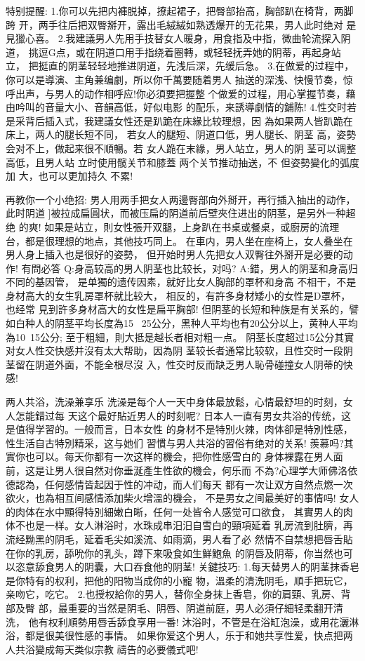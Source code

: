 \documentclass[12pt,UTF8]{ctexbook}
\begin{document}
特别提醒:
1.你可以先把内褲脱掉，撩起裙子，把臀部抬高，胸部趴在椅背，两脚跨
开，两手往后把双臀掰开，露出毛絨絨如熟透爆开的无花果，男人此时绝对
是見獵心喜。
2.我建議男人先用手技替女人暖身，用食指及中指，微曲轮流探入阴道，
挑逗G点，或在阴道口用手指绕着圈轉，或轻轻抚弄她的阴蒂，再起身站立，
把挺直的阴茎轻轻地推进阴道，先浅后深，先缓后急。
3.在做爱的过程中，你可以是導演、主角兼编劇，所以你千萬要随着男人
抽送的深浅、快慢节奏，惊呼出声，与男人的动作相呼应!你必須要把握整
个做爱的过程，用心掌握节奏，藉由吟叫的音量大小、音韻高低，好似电影
的配乐，来誘導劇情的鋪陈!
4.性交时若是采背后插入式，我建議女性还是趴跪在床緣比较理想，因
為如果两人皆趴跪在床上，两人的腿长短不同，
若女人的腿短、阴道口低，男人腿长、阴茎
高，姿勢会对不上，做起来很不順暢。若
女人跪在末緣，男人站立，男人的阴
茎可以调整高低，且男人站
立时使用髋关节和膝蓋
两个关节推动抽送，不
但姿勢變化的弧度加
大，也可以更加持久
不累!

再教你一个小绝招:
男人用两手把女人两邊臀部向外掰开，再行插入抽出的动作，此时阴道
]被拉成扁圓状，而被压扁的阴道前后壁夾住进出的阴茎，是另外一种超绝
的爽!
如果是站立，則女性張开双腿，上身趴在书桌或餐桌，或廚房的流理
台，都是很理想的地点，其他技巧同上。
在車内，男人坐在座椅上，女人叠坐在男人身上插入也是很好的姿勢，
但开始时男人先把女人双臀往外掰开是必要的动作!
有問必答
Q:身高较高的男人阴茎也比较长，对吗?
A:錯，男人的阴茎和身高归不同的基因管，
是单獨的遗传因素，就好比女人胸部的罩杯和身高
不相干，不是身材高大的女生乳房罩杯就比较大，
相反的，有許多身材矮小的女性是D罩杯，也经常
見到許多身材高大的女性是扁平胸部!
但阴茎的长短和种族是有关系的，譬如白种人的阴茎平均长度為15
~25公分，黑种人平均也有20公分以上，黄种人平均為10~15公分;
至于粗細，則大抵是越长者相对粗一点。
阴茎长度超过15公分其實对女人性交快感并沒有太大帮助，因為阴
茎较长者通常比较软，且性交时一段阴茎留在阴道外面，不能全根尽沒
入，性交时反而缺乏男人恥骨碰撞女人阴蒂的快感!

两人共浴，洗澡兼享乐
洗澡是每个人一天中身体最放鬆，心情最舒坦的时刻，女人怎能錯过每
天这个最好貼近男人的时刻呢?
日本人一直有男女共浴的传统，这是值得学習的。一般而言，日本女性
的身材不是特別火辣，肉体卻是特別性感，性生活自古特別精采，这与她们
習慣与男人共浴的習俗有绝对的关系!
羨慕吗?其實你也可以。每天你都有一次这样的機会，把你性感雪白的
身体裸露在男人面前，这是让男人很自然对你垂涎產生性欲的機会，何乐而
不為?心理学大师佛洛依德認為，任何感情皆起因于性的冲动，而人们每天
都有一次让双方自然点燃一次欲火，也為相互间感情添加柴火增溫的機会，
不是男女之间最美好的事情吗!
女人的肉体在水中顯得特別細嫩白晰，任何一处皆令人感觉可口欲食，
其實男人的肉体不也是一样。女人淋浴时，水珠成串汨汨自雪白的頸項延着
乳房流到肚臍，再流经黝黑的阴毛，延着毛尖如溪流、如雨滴，男人看了必
然情不自禁想把唇舌貼在你的乳房，舔吮你的乳头，蹲下来吸食如生鮮鮑魚
的阴唇及阴蒂，你当然也可以恣意舔食男人的阴囊，大口吞食他的阴茎!
关鍵技巧:
1.每天替男人的阴茎抹香皂是你特有的权利，把他的阳物当成你的小寵
物，溫柔的清洗阴毛，順手把玩它，亲吻它，吃它。
2.也授权給你的男人，替你全身抹上香皂，你的肩頸、乳房、背部及臀
部，最重要的当然是阴毛、阴唇、阴道前庭，男人必須仔細轻柔翻开清洗，
他有权利順勢用唇舌舔食享用一番!
沐浴时，不管是在浴缸泡澡，或用花灑淋浴，都是很美很性感的事情。
如果你爱这个男人，乐于和她共享性爱，快点把两人共浴變成每天类似宗教
禱告的必要儀式吧!
\end{document}
